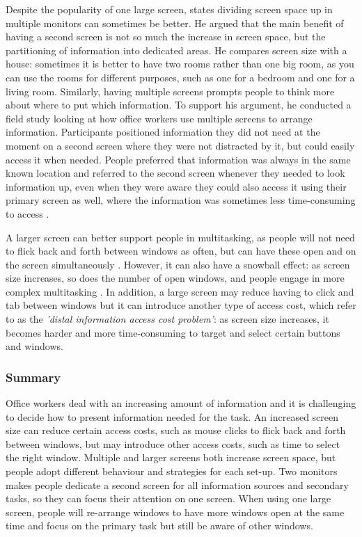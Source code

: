 \documentclass[11pt,oneside]{report}
\begin{document}
Despite the popularity of one large screen, \citet{Grudin2001} states dividing screen space up in multiple monitors can sometimes be better. He argued that the main benefit of having a second screen is not so much the increase in screen space, but the partitioning of information into dedicated areas. He compares screen size with a house: sometimes it is better to have two rooms rather than one big room, as you can use the rooms for different purposes, such as one for a bedroom and one for a living room. Similarly, having multiple screens prompts people to think more about where to put which information. To support his argument, he conducted a field study looking at how office workers use multiple screens to arrange information. Participants positioned information they did not need at the moment on a second screen where they were not distracted by it, but could easily access it when needed. People preferred that information was always in the same known location and referred to the second screen whenever they needed to look information up, even when they were aware they could also access it using their primary screen as well, where the information was sometimes less time-consuming to access \citep{Grudin2001}. 

A larger screen can better support people in multitasking, as people will not need to flick back and forth between windows as often, but can have these open and on the screen simultaneously \citep{Czerwinski2003}. However, it can also have a snowball effect: as screen size increases, so does the number of open windows, and people engage in more complex multitasking \citep{Robertson2005}. In addition, a large screen may reduce having to click and tab between windows but it can introduce another type of access cost, which \citet{Robertson2005} refer to as the \textit{'distal information access cost problem'}: as screen size increases, it becomes harder and more time-consuming to target and select certain buttons and windows. 

\subsubsection{Summary}
Office workers deal with an increasing amount of information and it is challenging to decide how to present information needed for the task. An increased screen size can reduce certain access costs, such as mouse clicks to flick back and forth between windows, but may introduce other access costs, such as time to select the right window. 
Multiple and larger screens both increase screen space, but people adopt different behaviour and strategies for each set-up. Two monitors makes people dedicate a second screen for all information sources and secondary tasks, so they can focus their attention on one screen. When using one large screen, people will re-arrange windows to have more windows open at the same time and focus on the primary task but still be aware of other windows. 
\end{document}
